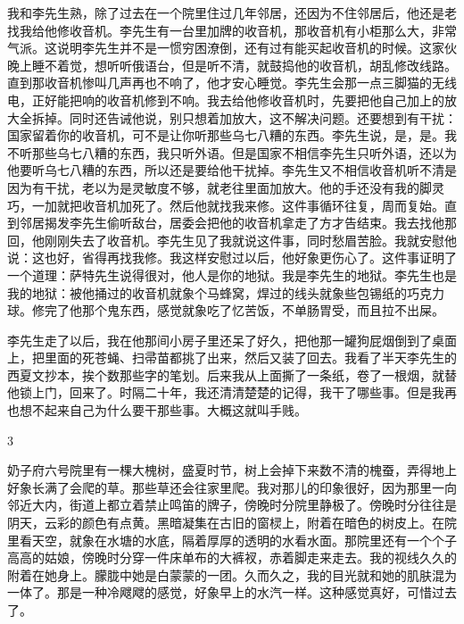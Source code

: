 我和李先生熟，除了过去在一个院里住过几年邻居，还因为不住邻居后，他还是老找我给他修收音机。李先生有一台里加牌的收音机，那收音机有小柜那么大，非常气派。这说明李先生并不是一惯穷困潦倒，还有过有能买起收音机的时候。这家伙晚上睡不着觉，想听听俄语台，但是听不清，就鼓捣他的收音机，胡乱修改线路。直到那收音机惨叫几声再也不响了，他才安心睡觉。李先生会那一点三脚猫的无线电，正好能把响的收音机修到不响。我去给他修收音机时，先要把他自己加上的放大全拆掉。同时还告诫他说，别只想着加放大，这不解决问题。还要想到有干扰：国家留着你的收音机，可不是让你听那些乌七八糟的东西。李先生说，是，是。我不听那些乌七八糟的东西，我只听外语。但是国家不相信李先生只听外语，还以为他要听乌七八糟的东西，所以还是要给他干扰掉。李先生又不相信收音机听不清是因为有干扰，老以为是灵敏度不够，就老往里面加放大。他的手还没有我的脚灵巧，一加就把收音机加死了。然后他就找我来修。这件事循环往复，周而复始。直到邻居揭发李先生偷听敌台，居委会把他的收音机拿走了方才告结束。我去找他那回，他刚刚失去了收音机。李先生见了我就说这件事，同时愁眉苦脸。我就安慰他说：这也好，省得再找我修。我这样安慰过以后，他好象更伤心了。这件事证明了一个道理：萨特先生说得很对，他人是你的地狱。我是李先生的地狱。李先生也是我的地狱：被他捅过的收音机就象个马蜂窝，焊过的线头就象些包锡纸的巧克力球。修完了他那个鬼东西，感觉就象吃了忆苦饭，不单肠胃受，而且拉不出屎。 

李先生走了以后，我在他那间小房子里还呆了好久，把他那一罐狗屁烟倒到了桌面上，把里面的死苍蝇、扫帚苗都挑了出来，然后又装了回去。我看了半天李先生的西夏文抄本，挨个数那些字的笔划。后来我从上面撕了一条纸，卷了一根烟，就替他锁上门，回来了。时隔二十年，我还清清楚楚的记得，我干了哪些事。但是我再也想不起来自己为什么要干那些事。大概这就叫手贱。 

3 

奶子府六号院里有一棵大槐树，盛夏时节，树上会掉下来数不清的槐蚕，弄得地上好象长满了会爬的草。那些草还会往家里爬。我对那儿的印象很好，因为那里一向邻近大内，街道上都立着禁止鸣笛的牌子，傍晚时分院里静极了。傍晚时分往往是阴天，云彩的颜色有点黄。黑暗凝集在古旧的窗棂上，附着在暗色的树皮上。在院里看天空，就象在水塘的水底，隔着厚厚的透明的水看水面。那院里还有一个个子高高的姑娘，傍晚时分穿一件床单布的大裤衩，赤着脚走来走去。我的视线久久的附着在她身上。朦胧中她是白蒙蒙的一团。久而久之，我的目光就和她的肌肤混为一体了。那是一种冷飕飕的感觉，好象早上的水汽一样。这种感觉真好，可惜过去了。 

